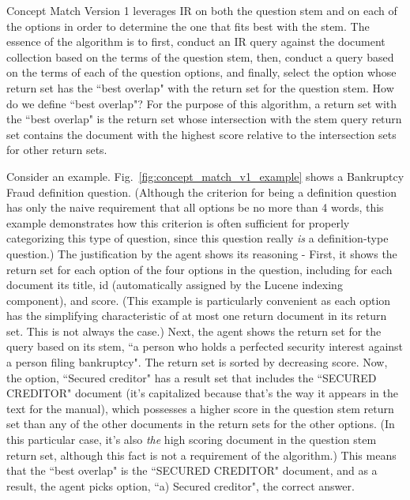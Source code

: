 Concept Match Version 1 leverages IR on both the question stem and on each of the options in order to determine the one that fits best with the stem.  The essence of the algorithm is to first, conduct an IR query against the document collection based on the terms of the question stem, then, conduct a query based on the terms of each of the question options, and finally, select the option whose return set has the ``best overlap" with the return set for the question stem.  How do we define ``best overlap"?  For the purpose of this algorithm, a return set with the ``best overlap" is the return set whose intersection with the stem query return set contains the document with the highest score relative to the intersection sets for other return sets.

Consider an example.  Fig.~\ref{fig:concept_match_v1_example} shows a Bankruptcy Fraud definition question.  (Although the criterion for being a definition question has only the naive requirement that all options be no more than 4 words, this example demonstrates how this criterion is often sufficient for properly categorizing this type of question, since this question really \emph{is} a definition-type question.)  The justification by the agent shows its reasoning - First, it shows the return set for each option of the four options in the question, including for each document its title, id (automatically assigned by the Lucene indexing component), and score.  (This example is particularly convenient as each option has the simplifying characteristic of at most one return document in its return set.  This is not always the case.)  Next, the agent shows the return set for the query based on its stem, ``a person who holds a perfected security interest against a person filing bankruptcy".  The return set is sorted by decreasing score.  Now, the option, ``Secured creditor" has a result set that includes the ``SECURED CREDITOR" document (it's capitalized because that's the way it appears in the text for the manual), which possesses a higher score in the question stem return set than any of the other documents in the return sets for the other options.  (In this particular case, it's also \emph{the} high scoring document in the question stem return set, although this fact is not a requirement of the algorithm.)  This means that the ``best overlap" is the ``SECURED CREDITOR" document, and as a result, the agent picks option, ``a) Secured creditor", the correct answer.

